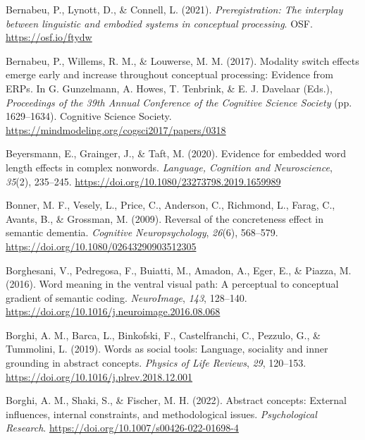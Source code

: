 \documentclass[
  12pt,
  man,floatsintext]{apa7}
\newlength{\cslhangindent}
\newlength{\cslentryspacingunit} %
\newenvironment{CSLReferences}[2] %
 {%
  \setlength{\parindent}{0pt}
  \ifodd #1
  \let\oldpar\par
  \def\par{\hangindent=\cslhangindent\oldpar}
  \fi
  \setlength{\parskip}{#2\cslentryspacingunit}
 }%
 {}
\begin{document}
\begin{CSLReferences}{1}{0}
\leavevmode{}%
Bernabeu, P., Lynott, D., \& Connell, L. (2021). \emph{Preregistration: {The} interplay between linguistic and embodied systems in conceptual processing}. {OSF}. \url{https://osf.io/ftydw}

\leavevmode{}%
Bernabeu, P., Willems, R. M., \& Louwerse, M. M. (2017). Modality switch effects emerge early and increase throughout conceptual processing: {Evidence} from {ERPs}. In G. Gunzelmann, A. Howes, T. Tenbrink, \& E. J. Davelaar (Eds.), \emph{Proceedings of the 39th {Annual Conference} of the {Cognitive Science Society}} (pp. 1629--1634). {Cognitive Science Society}. \url{https://mindmodeling.org/cogsci2017/papers/0318}

\leavevmode{}%
Beyersmann, E., Grainger, J., \& Taft, M. (2020). Evidence for embedded word length effects in complex nonwords. \emph{Language, Cognition and Neuroscience}, \emph{35}(2), 235--245. \url{https://doi.org/10.1080/23273798.2019.1659989}

\leavevmode{}%
Bonner, M. F., Vesely, L., Price, C., Anderson, C., Richmond, L., Farag, C., Avants, B., \& Grossman, M. (2009). Reversal of the concreteness effect in semantic dementia. \emph{Cognitive Neuropsychology}, \emph{26}(6), 568--579. \url{https://doi.org/10.1080/02643290903512305}

\leavevmode{}%
Borghesani, V., Pedregosa, F., Buiatti, M., Amadon, A., Eger, E., \& Piazza, M. (2016). Word meaning in the ventral visual path: {A} perceptual to conceptual gradient of semantic coding. \emph{NeuroImage}, \emph{143}, 128--140. \url{https://doi.org/10.1016/j.neuroimage.2016.08.068}

\leavevmode{}%
Borghi, A. M., Barca, L., Binkofski, F., Castelfranchi, C., Pezzulo, G., \& Tummolini, L. (2019). Words as social tools: {Language}, sociality and inner grounding in abstract concepts. \emph{Physics of Life Reviews}, \emph{29}, 120--153. \url{https://doi.org/10.1016/j.plrev.2018.12.001}

\leavevmode{}%
Borghi, A. M., Shaki, S., \& Fischer, M. H. (2022). Abstract concepts: External influences, internal constraints, and methodological issues. \emph{Psychological Research}. \url{https://doi.org/10.1007/s00426-022-01698-4}


\end{CSLReferences}
\end{document}

